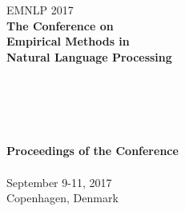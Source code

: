 \documentclass[11pt]{article}
\begin{document}
  \begin{center}
  \LARGE EMNLP 2017 \\
  \vspace*{55mm}
    {\bf
    \LARGE
     The Conference on \\
     Empirical Methods in \\
     Natural Language Processing \\
    \hspace*{1cm}\\ \hspace*{1cm} \\
    \hspace*{1cm} \\ \hspace*{1cm}\\
    \hspace*{1cm}\\
    \vspace{2cm}
    \LARGE
    Proceedings of the Conference\\
    \vspace{2cm}
    \hspace*{1cm}} \\ %
    \vspace{43mm}
    \LARGE
    September 9-11, 2017\\
    Copenhagen, Denmark
  \end{center}
\end{document}
